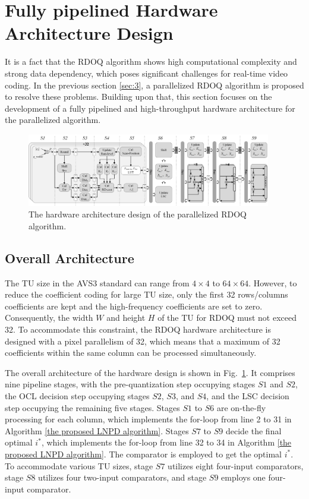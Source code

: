\documentclass[lettersize,journal]{IEEEtran}
\begin{document}
\section{Fully pipelined Hardware Architecture Design}
\label{sec:4}
It is a fact that the RDOQ algorithm shows high computational complexity and strong data dependency, which poses significant challenges for real-time video coding. In the previous section \ref{sec:3}, a parallelized RDOQ algorithm is proposed to resolve these problems. Building upon that, this section focuses on the development of a fully pipelined and high-throughput hardware architecture for the parallelized algorithm. 
\par
\begin{figure}[htbp]
	\centering
    \vspace{-5pt}
	\centerline{\includegraphics[width=0.95\textwidth]{figure/overall_architecture.png}} 
    \vspace{-5pt}
	\caption{The hardware architecture design of the parallelized RDOQ algorithm.}
	\label{overall_architecture} %
\end{figure}

\subsection{Overall Architecture}
The TU size in the AVS3 standard can range from $4\times4$ to $64\times64$. However, to reduce the coefficient coding for large TU size, only the first 32 rows/columns coefficients are kept and the high-frequency coefficients are set to zero. Consequently, the width $W$ and height $H$ of the TU for RDOQ must not exceed 32. To accommodate this constraint, the RDOQ hardware architecture is designed with a pixel parallelism of 32, which means that a maximum of 32 coefficients within the same column can be processed simultaneously. 

The overall architecture of the hardware design is shown in Fig.~\ref{overall_architecture}. It comprises nine pipeline stages, with the pre-quantization step occupying stages $S1$ and $S2$, the OCL decision step occupying stages $S2$, $S3$, and $S4$, and the LSC decision step occupying the remaining five stages. Stages $S1$ to $S6$ are on-the-fly processing for each column, which implements the for-loop from line 2 to 31 in Algorithm \ref{the proposed LNPD algorithm}. Stages $S7$ to $S9$ decide the final optimal $i_{}^{*}$, which implements the for-loop from line 32 to 34 in Algorithm \ref{the proposed LNPD algorithm}. The comparator is employed to get the optimal $i_{}^{*}$. To accommodate various TU sizes, stage $S7$ utilizes eight four-input comparators, stage $S8$ utilizes four two-input comparators, and stage $S9$ employs one four-input comparator. 
\end{document}
